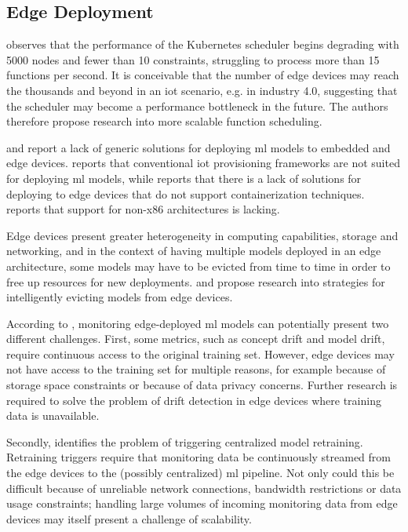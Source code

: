 \subsection{Edge Deployment}
\cite{Rausch2019a} observes that the performance of the Kubernetes scheduler begins degrading with 5000 nodes and fewer than 10 constraints, struggling to process more than 15 functions per second.
It is conceivable that the number of edge devices may reach the thousands and beyond in an \acrshort{iot} scenario, e.g. in industry 4.0, suggesting that the scheduler may become a performance bottleneck in the future.
The authors therefore propose research into more scalable function scheduling.

\cite{Bosch2021} and \cite{Rausch2019} report a lack of generic solutions for deploying \acrshort{ml} models to embedded and edge devices.
\cite{Rausch2019} reports that conventional \acrshort{iot} provisioning frameworks are not suited for deploying \acrshort{ml} models, while \cite{Gupta2020} reports that there is a lack of solutions for deploying to edge devices that do not support containerization techniques.
\cite{Rausch2019a} reports that support for non-x86 architectures is lacking.

Edge devices present greater heterogeneity in computing capabilities, storage and networking, and in the context of having multiple models deployed in an edge architecture, some models may have to be evicted from time to time in order to free up resources for new deployments.
\cite{Rausch2019} and \cite{Rausch2019a} propose research into strategies for intelligently evicting models from edge devices.

According to \cite{Rausch2019}, monitoring edge-deployed \acrshort{ml} models can potentially present two different challenges.
First, some metrics, such as concept drift and model drift, require continuous access to the original training set.
However, edge devices may not have access to the training set for multiple reasons, for example because of storage space constraints or because of data privacy concerns.
Further research is required to solve the problem of drift detection in edge devices where training data is unavailable.

Secondly, \cite{Rausch2019} identifies the problem of triggering centralized model retraining.
Retraining triggers require that monitoring data be continuously streamed from the edge devices to the (possibly centralized) \acrshort{ml} pipeline.
Not only could this be difficult because of unreliable network connections, bandwidth restrictions or data usage constraints; handling large volumes of incoming monitoring data from edge devices may itself present a challenge of scalability.

